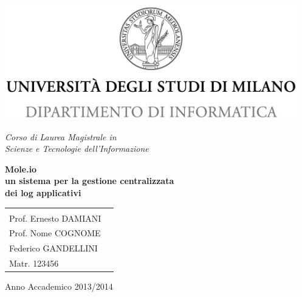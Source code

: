 \begin{titlepage}
  \begin{center}
    \includegraphics[height=5.0cm]{img/minerva_2013_DI.jpg}
    
    \vspace*{.4cm}
    {\Large 
      \emph{Corso di Laurea Magistrale in\\[.3cm]
        Scienze e Tecnologie dell'Informazione}
    }
    \vfill
    \begin{LARGE}
      \textbf{Mole.io\\[0.4cm]
        un sistema per la gestione centralizzata\\[0.6cm]
        dei log applicativi}
    \end{LARGE}
    
    \vfill
    \begin{minipage}{.99\linewidth}
      \begin{tabular}{l r}
        \begin{minipage}{.4\linewidth}
          \begin{flushleft}
            {\large
              RELATORE\\[.3cm]
              Prof. Ernesto DAMIANI
            }
            
            \vspace*{1.5cm}
            {\large
              CORRELATORE\\[.3cm]
              Prof. Nome COGNOME
            }
          \end{flushleft}
        \end{minipage}
        &
        \begin{minipage}{.6\linewidth}
          \begin{flushright}
            {\large
              TESI DI LAUREA DI\\[.3cm]
              Federico GANDELLINI\\[.45cm]
              Matr. 123456
            }
          \end{flushright}
        \end{minipage}
      \end{tabular}
    \end{minipage}
    
    \vfill
    {\large{{Anno Accademico 2013/2014}}}
  \end{center}
\end{titlepage}

